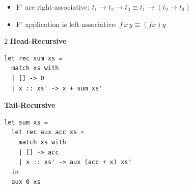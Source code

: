 

\begin{itemize} [leftmargin = *,noitemsep]
    \item  F' are right-associative: $t_{1} \rightarrow t_{2}  \rightarrow t_3 \equiv  t_1  \rightarrow (t_2  \rightarrow t_3)$
    \item F' application is left-associative: $f\,x\,y \equiv (fx)y$
\end{itemize}
\begin{multicols}{2}
\textbf{Head-Recursive}
\begin{lstlisting}
let rec sum xs =
  match xs with
  | [] -> 0
  | x :: xs' -> x + sum xs'
\end{lstlisting}
\columnbreak
\textbf{Tail-Recursive}
\begin{lstlisting}
let sum xs =
  let rec aux acc xs =
    match xs with
    | [] -> acc
    | x :: xs' -> aux (acc + x) xs'
  in
  aux 0 xs
\end{lstlisting}
\end{multicols}










